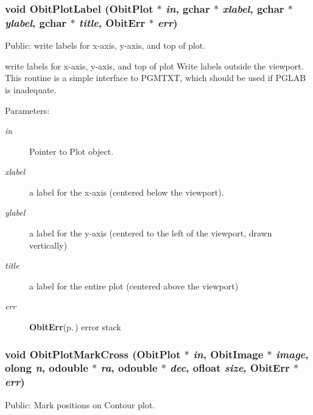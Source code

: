 \subsubsection{\setlength{\rightskip}{0pt plus 5cm}void Obit\-Plot\-Label ({\bf Obit\-Plot} $\ast$ {\em in}, gchar $\ast$ {\em xlabel}, gchar $\ast$ {\em ylabel}, gchar $\ast$ {\em title}, {\bf Obit\-Err} $\ast$ {\em err})}\label{ObitPlot_8c_a18}


Public: write labels for x-axis, y-axis, and top of plot. 

write labels for x-axis, y-axis, and top of plot Write labels outside the viewport. This routine is a simple interface to PGMTXT, which should be used if PGLAB is inadequate. \begin{Desc}
\item[Parameters:]
\begin{description}
\item[{\em in}]Pointer to Plot object. \item[{\em xlabel}]a label for the x-axis (centered below the viewport). \item[{\em ylabel}]a label for the y-axis (centered to the left of the viewport, drawn vertically) \item[{\em title}]a label for the entire plot (centered above the viewport) \item[{\em err}]{\bf Obit\-Err}{\rm (p.\,\pageref{structObitErr})} error stack \end{description}
\end{Desc}
\subsubsection{\setlength{\rightskip}{0pt plus 5cm}void Obit\-Plot\-Mark\-Cross ({\bf Obit\-Plot} $\ast$ {\em in}, {\bf Obit\-Image} $\ast$ {\em image}, {\bf olong} {\em n}, {\bf odouble} $\ast$ {\em ra}, {\bf odouble} $\ast$ {\em dec}, {\bf ofloat} {\em size}, {\bf Obit\-Err} $\ast$ {\em err})}\label{ObitPlot_8c_a15}


Public: Mark positions on Contour plot. 

